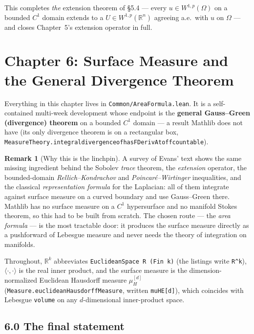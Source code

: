﻿\documentclass[12pt, a4paper]{article}
\renewcommand{\_}{\origunderscore\allowbreak}
\theoremstyle{definition}
\newtheorem{remark}{Remark}[section]
\theoremstyle{plain}
\begin{document}
This completes \emph{the} extension theorem of \S5.4 --- every $u\in W^{1,p}(\Omega)$ on a bounded
$C^1$ domain extends to a $U\in W^{1,p}(\mathbb R^n)$ agreeing a.e.\ with $u$ on $\Omega$ --- and closes
Chapter~5's extension operator in full.

\section{Chapter 6: Surface Measure and the General Divergence Theorem}

Everything in this chapter lives in \texttt{Common/\allowbreak AreaFormula.\allowbreak lean}.  It is a self-contained
multi-week development whose endpoint is the \textbf{general Gauss--Green (divergence) theorem}
on a bounded $C^1$ domain --- a result Mathlib does not have (its only divergence theorem is on a
rectangular box, \texttt{MeasureTheory.integral\_divergence\_of\_hasFDerivAt\_off\_countable}).

\begin{remark}[Why this is the linchpin]
A survey of Evans' text shows the same missing ingredient behind the Sobolev \emph{trace} theorem,
the \emph{extension} operator, the bounded-domain \emph{Rellich--Kondrachov} and
\emph{Poincar\'e--Wirtinger} inequalities, and the classical \emph{representation formula} for the
Laplacian: all of them integrate against surface measure on a curved boundary and use Gauss--Green
there.  Mathlib has no surface measure on a $C^1$ hypersurface and no manifold Stokes theorem, so
this had to be built from scratch.  The chosen route --- the \emph{area formula} --- is the most
tractable door: it produces the surface measure directly as a pushforward of Lebesgue measure and
never needs the theory of integration on manifolds.
\end{remark}

Throughout, $\mathbb{R}^k$ abbreviates \texttt{EuclideanSpace R (Fin k)} (the listings write
\texttt{R\^{}k}), $\langle\cdot,\cdot\rangle$ is the real inner product, and the surface measure is the
dimension-normalized Euclidean Hausdorff measure $\mu_H^{[d]}$
(\texttt{Measure.euclideanHausdorffMeasure}, written \texttt{muHE[d]}), which coincides with
Lebesgue \texttt{volume} on any $d$-dimensional inner-product space.

\subsection{6.0 The final statement}
\end{document}
